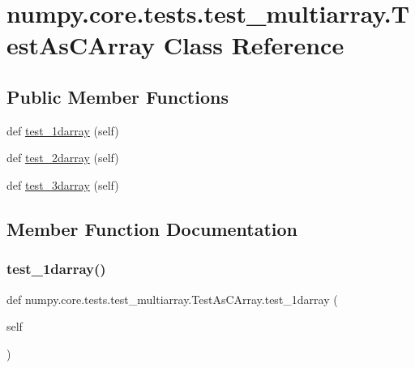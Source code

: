 \hypertarget{classnumpy_1_1core_1_1tests_1_1test__multiarray_1_1TestAsCArray}{}\section{numpy.\+core.\+tests.\+test\+\_\+multiarray.\+Test\+As\+C\+Array Class Reference}
\label{classnumpy_1_1core_1_1tests_1_1test__multiarray_1_1TestAsCArray}
\subsection*{Public Member Functions}
\begin{DoxyCompactItemize}
\item 
def \hyperlink{classnumpy_1_1core_1_1tests_1_1test__multiarray_1_1TestAsCArray_a55e8d550a3c6f6d51735ade6f42f7610}{test\+\_\+1darray} (self)
\item 
def \hyperlink{classnumpy_1_1core_1_1tests_1_1test__multiarray_1_1TestAsCArray_abb2829fc1f03e71f33e76fce4da7e3a4}{test\+\_\+2darray} (self)
\item 
def \hyperlink{classnumpy_1_1core_1_1tests_1_1test__multiarray_1_1TestAsCArray_a2b1560a938a11382a365db50361934d1}{test\+\_\+3darray} (self)
\end{DoxyCompactItemize}


\subsection{Member Function Documentation}
\mbox{\label{classnumpy_1_1core_1_1tests_1_1test__multiarray_1_1TestAsCArray_a55e8d550a3c6f6d51735ade6f42f7610}} 
\subsubsection{\texorpdfstring{test\+\_\+1darray()}{test\_1darray()}}
{\footnotesize\ttfamily def numpy.\+core.\+tests.\+test\+\_\+multiarray.\+Test\+As\+C\+Array.\+test\+\_\+1darray (\begin{DoxyParamCaption}\item[{}]{self }\end{DoxyParamCaption})}

